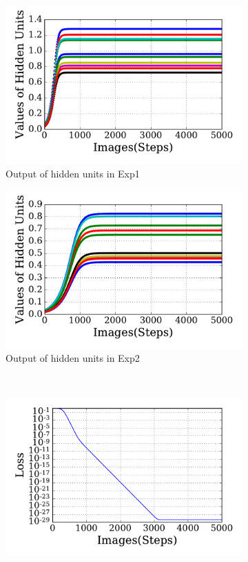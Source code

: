 \begin{figure}
\begin{subfigure}[t]{0.48\textwidth}
		\includegraphics[width=\textwidth]{pics_sdlm/20_exp_AE/exp1_hid_non.pdf}
		\caption{Output of hidden units in Exp1}
	\end{subfigure}
	\begin{subfigure}[t]{0.48\textwidth}
		\includegraphics[width=\textwidth]{pics_sdlm/20_exp_AE/exp2_hid_non.pdf}
		\caption{Output of hidden units in Exp2}
	\end{subfigure}\\
	\begin{subfigure}[t]{0.48\textwidth}
		\includegraphics[width=\textwidth]{pics_sdlm/20_exp_AE/exp1_loss.pdf}

\end{subfigure}
\end{figure}
